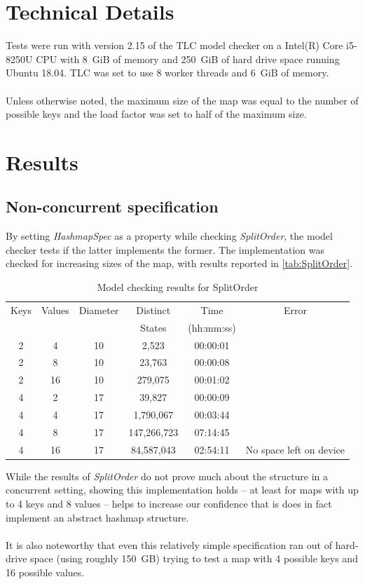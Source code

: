 \documentclass{uit-thesis}
\begin{document}
\section{Technical Details}
Tests were run with version 2.15 of the TLC model checker on a Intel(R) Core i5-8250U CPU with 8~GiB of memory and 250~GiB of hard drive space running Ubuntu 18.04. TLC was set to use 8 worker threads and 6~GiB of memory.
\\\\
Unless otherwise noted, the maximum size of the map was equal to the number of possible keys and the load factor was set to half of the maximum size.

\section{Results}
\subsection{Non-concurrent specification}
By setting \textit{HashmapSpec} as a property while checking \textit{SplitOrder}, the model checker tests if the latter implements the former. The implementation was checked for increasing sizes of the map, with results reported in \autoref{tab:SplitOrder}.
\begin{table}[h]
    \begin{tabular}{ |c|c||c|c|c|c| }
        \hline
        Keys & Values & Diameter & Distinct & Time & Error\\
             &        &          & States   & (hh:mm:ss)&\\
        \hline
        2 & 4  & 10 & 2,523      & 00:00:01 &\\
        2 & 8  & 10 & 23,763     & 00:00:08 &\\
        2 & 16 & 10 & 279,075    & 00:01:02 &\\
        4 & 2  & 17 & 39,827     & 00:00:09 &\\
        4 & 4  & 17 & 1,790,067  & 00:03:44 &\\
        4 & 8  & 17 & 147,266,723& 07:14:45 &\\
        4 & 16 & 17 & 84,587,043 & 02:54:11 & No space left on device\\
        \hline
    \end{tabular}
\caption{Model checking results for SplitOrder}
\label{tab:SplitOrder}
\end{table}
While the results of \textit{SplitOrder} do not prove much about the structure in a concurrent setting, showing this implementation holds -- at least for maps with up to 4 keys and 8 values -- helps to increase our confidence that is does in fact implement an abstract hashmap structure.
\\\\
It is also noteworthy that even this relatively simple specification ran out of hard-drive space (using roughly 150~GB) trying to test a map with 4 possible keys and 16 possible values.
\end{document}
